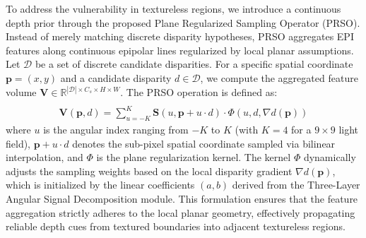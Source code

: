 \documentclass[lettersize,journal]{IEEEtran}
\begin{document}
To address the vulnerability in textureless regions, we introduce a continuous depth prior through the proposed Plane Regularized Sampling Operator (PRSO). Instead of merely matching discrete disparity hypotheses, PRSO aggregates EPI features along continuous epipolar lines regularized by local planar assumptions. Let $\mathcal{D}$ be a set of discrete candidate disparities. For a specific spatial coordinate $\mathbf{p} = (x,y)$ and a candidate disparity $d \in \mathcal{D}$, we compute the aggregated feature volume $\mathbf{V} \in \mathbb{R}^{|\mathcal{D}| \times C_s \times H \times W}$. The PRSO operation is defined as:
\begin{multline}
 \\
\mathbf{V}(\mathbf{p}, d) = \sum_{u=-K}^{K} \mathbf{S}(u, \mathbf{p} + u \cdot d) \cdot \Phi(u, d, \nabla d(\mathbf{p}))
\label{eq:ch3_9}
\end{multline}
where $u$ is the angular index ranging from $-K$ to $K$ (with $K=4$ for a $9 \times 9$ light field), $\mathbf{p} + u \cdot d$ denotes the sub-pixel spatial coordinate sampled via bilinear interpolation, and $\Phi$ is the plane regularization kernel. The kernel $\Phi$ dynamically adjusts the sampling weights based on the local disparity gradient $\nabla d(\mathbf{p})$, which is initialized by the linear coefficients $(a, b)$ derived from the Three-Layer Angular Signal Decomposition module. This formulation ensures that the feature aggregation strictly adheres to the local planar geometry, effectively propagating reliable depth cues from textured boundaries into adjacent textureless regions.
\end{document}
